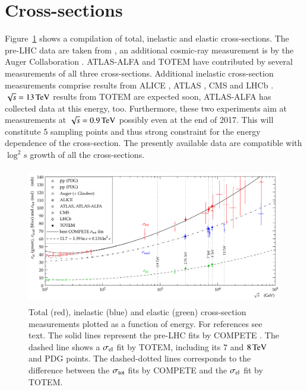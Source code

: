 \documentclass{webofc}
\def\un#1{\,{\rm #1}}
\begin{document}
\section{Cross-sections}
\label{s:cs}

Figure~\ref{f:cs summary} shows a compilation of total, inelastic and elastic cross-sections. The pre-LHC data are taken from \cite{pdg}, an additional cosmic-ray measurement is by the Auger Collaboration \cite{auger-57tev}. ATLAS-ALFA \cite{alfa-si-el-7tev,alfa-si-el-8tev} and TOTEM \cite{totem-si-tot-7tev,totem-si-8tev,totem-si-2.76tev} have contributed by several measurements of all three cross-sections. Additional inelastic cross-section measurements comprise results from ALICE \cite{alice-inel-sd-dd}, ATLAS \cite{atlas-inel-7tev,atlas-inel-13tev}, CMS \cite{cms-inel-7tev,cms-inel-13tev} and LHCb \cite{lhcb-inel-7tev}. $\sqrt s = 13\un{TeV}$ results from TOTEM are expected soon, ATLAS-ALFA has collected data at this energy, too. Furthermore, these two experiments aim at measurements at $\sqrt s = 0.9\un{TeV}$ possibly even at the end of 2017. This will constitute 5 sampling points and thus strong constraint for the energy dependence of the cross-section. The presently available data are compatible with $\log^2 s$ growth of all the cross-sections.

\begin{figure}[h]
\centering
\includegraphics[height=6cm,clip]{fig/sigma_tot_el_inel_vs_s.pdf}
\vskip-4mm
\caption{Total (red), inelastic (blue) and elastic (green) cross-section measurements plotted as a function of energy. For references see text. The solid lines represent the pre-LHC fits by COMPETE \cite{compete}. The dashed line shows a $\sigma_{\rm el}$ fit by TOTEM, including its $7$ and $8\un{TeV}$ and PDG \cite{pdg} points. The dashed-dotted lines corresponds to the difference between the $\sigma_{\rm tot}$ fits by COMPETE and the $\sigma_{\rm el}$ fit by TOTEM.}
\label{f:cs summary}
\end{figure}
\end{document}
